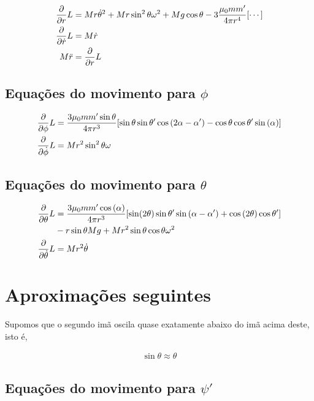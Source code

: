 \documentclass[a4paper, 12pt]{article}
\begin{document}
\begin{align}
    \pdv{}{r}L&=Mr\dot{\theta}^2+Mr\sin^2\theta\omega^2+Mg\cos\theta-3\frac{\mu_0mm'}{4\pi r^4}\qty[\cdots]\nonumber\\
    \pdv{}{\dot{r}}L&=M\dot{r}\nonumber\\
    M\ddot{r}&=\pdv{}{r}L
\end{align}

\subsection{Equações do movimento para $\phi$}

\begin{align}
    \pdv{}{\phi}L&=\frac{3\mu_0mm'\sin\theta}{4\pi r^3}\qty[\sin\theta\sin\theta'\cos\qty(2\alpha-\alpha')-\cos\theta\cos\theta'\sin\qty(\alpha)]\nonumber\\
    \pdv{}{\dot{\phi}}L&=Mr^2\sin^2\theta\omega\nonumber
\end{align}

\subsection{Equações do movimento para $\theta$}

\begin{align}
    \pdv{}{\theta}L&=\frac{3\mu_0mm'\cos\qty(\alpha)}{4\pi r^3}\qty[\sin(2\theta)\sin\theta'\sin\qty(\alpha-\alpha')+\cos\qty(2\theta)\cos\theta']\nonumber\\
    &-r\sin\theta Mg+Mr^2\sin\theta\cos\theta\omega^2\nonumber\\
    \pdv{}{\dot{\theta}}L&=Mr^2\dot{\theta}\nonumber
\end{align}

\section{Aproximações seguintes}

Supomos que o segundo imã oscila quase exatamente abaixo do imã acima deste, isto é, 

\begin{align}
    \sin\theta \approx\theta
\end{align}

\subsection{Equações do movimento para $\psi'$}
\end{document}
